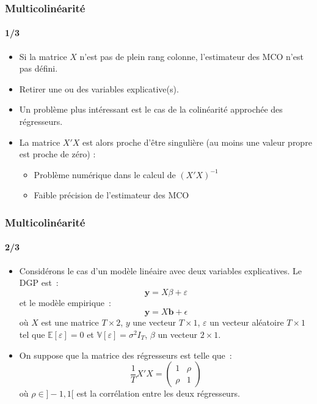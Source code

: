 \documentclass[10pt]{beamer}
\begin{document}
\begin{frame}
  \frametitle{Multicolinéarité}
  \framesubtitle{1/3}

  \begin{itemize}

  \item Si la matrice $X$ n'est pas de plein rang colonne, l'estimateur des MCO n'est pas défini.\newline

  \item[$\Rightarrow$] Retirer une ou des variables explicative(s).\newline

  \item Un problème plus intéressant est le cas de la colinéarité approchée des régresseurs.\newline

  \item La matrice $X'X$ est alors proche d'être singulière (au moins une valeur propre est proche de zéro) :\newline

    \begin{itemize}
    \item Problème numérique dans le calcul de $(X'X)^{-1}$\newline
    \item Faible précision de l'estimateur des MCO\newline
    \end{itemize}

  \end{itemize}

\end{frame}


\begin{frame}
  \frametitle{Multicolinéarité}
  \framesubtitle{2/3}

  \begin{itemize}

  \item Considérons le cas d'un modèle linéaire avec deux variables explicatives. Le DGP est~:
    \[
      \mathbf y = X\beta + \varepsilon
    \]
    et le modèle empirique~:
    \[
      \mathbf y = X \mathbf{b} + \epsilon
    \]
    où $X$ est une matrice $T\times 2$, $y$ une
    vecteur $T\times 1$, $\varepsilon$ un vecteur
    aléatoire $T\times 1$ tel que $\mathbb E[\varepsilon] = 0$
    et $\mathbb V[\varepsilon] = \sigma^2I_T$, $\beta$ un
    vecteur $2\times 1$.\newline

  \item On suppose que la matrice des régresseurs est telle que~:
    \[
      \frac{1}{T} X'X =
      \begin{pmatrix}
        1 & \rho \\
        \rho & 1
      \end{pmatrix}
    \]
    où $\rho\in]-1,1[$ est la corrélation entre les deux régresseurs.\newline

    \end{itemize}

  \end{frame}
\end{document}
